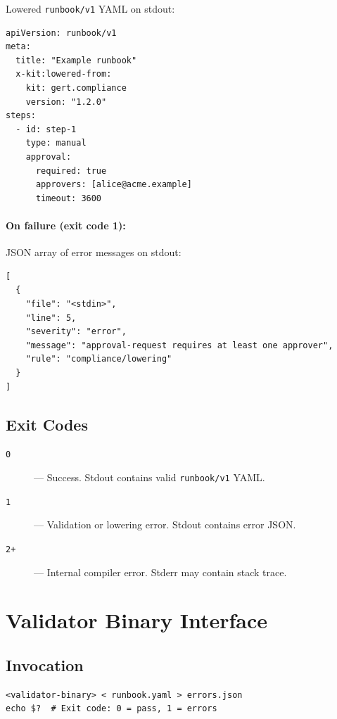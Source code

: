 Lowered \texttt{runbook/v1} YAML on stdout:

\begin{verbatim}
apiVersion: runbook/v1
meta:
  title: "Example runbook"
  x-kit:lowered-from:
    kit: gert.compliance
    version: "1.2.0"
steps:
  - id: step-1
    type: manual
    approval:
      required: true
      approvers: [alice@acme.example]
      timeout: 3600
\end{verbatim}

\paragraph{On failure (exit code 1):}

JSON array of error messages on stdout:

\begin{verbatim}
[
  {
    "file": "<stdin>",
    "line": 5,
    "severity": "error",
    "message": "approval-request requires at least one approver",
    "rule": "compliance/lowering"
  }
]
\end{verbatim}

\subsection{Exit Codes}

\begin{description}
  \item[\texttt{0}] --- Success. Stdout contains valid \texttt{runbook/v1} YAML.
  \item[\texttt{1}] --- Validation or lowering error. Stdout contains error JSON.
  \item[\texttt{2+}] --- Internal compiler error. Stderr may contain stack trace.
\end{description}

\section{Validator Binary Interface}
\label{sec:validator-reference}

\subsection{Invocation}

\begin{verbatim}
<validator-binary> < runbook.yaml > errors.json
echo $?  # Exit code: 0 = pass, 1 = errors
\end{verbatim}

